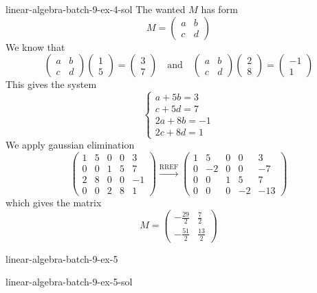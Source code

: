 \documentclass[preview]{standalone}
\begin{document}
\begin{snippetsolution}{linear-algebra-batch-9-ex-4-sol}{}
    The wanted \matrix \(M\) has form
    \[
        M = \begin{pmatrix}
            a & b \\
            c & d
        \end{pmatrix}
    \]
    We know that
    \[
        \begin{pmatrix}
            a & b \\
            c & d
        \end{pmatrix} \begin{pmatrix}
            1 \\
            5
        \end{pmatrix} = \begin{pmatrix}
            3 \\
            7
        \end{pmatrix}
        \quad \text{and} \quad
        \begin{pmatrix}
            a & b \\
            c & d
        \end{pmatrix} \begin{pmatrix}
            2 \\
            8
        \end{pmatrix} = \begin{pmatrix}
            -1 \\
            1
        \end{pmatrix}
    \]
    This gives the system
    \[
        \begin{cases}
            a + 5b = 3 \\
            c + 5d = 7 \\
            2a + 8b = -1 \\
            2c + 8d = 1
        \end{cases}
    \]
    We apply gaussian elimination
    \[
        \begin{pmatrix}
            1 & 5 & 0 & 0 & 3 \\
            0 & 0 & 1 & 5 & 7 \\
            2 & 8 & 0 & 0 & -1 \\
            0 & 0 & 2 & 8 & 1
        \end{pmatrix}
        \xrightarrow{\text{RREF}}
        \begin{pmatrix}
            1 & 5 & 0 & 0 & 3 \\
            0 & -2 & 0 & 0 & -7 \\
            0 & 0 & 1 & 5 & 7 \\
            0 & 0 & 0 & -2 & -13
        \end{pmatrix}
    \]
    which gives the matrix
    \[
        M = \begin{pmatrix}
            -\frac{29}{2} & \frac{7}{2} \\
            -\frac{51}{2} & \frac{13}{2}
        \end{pmatrix}
    \]
\end{snippetsolution}

\begin{snippetexercise}{linear-algebra-batch-9-ex-5}{}
    \todo
\end{snippetexercise}

\begin{snippetsolution}{linear-algebra-batch-9-ex-5-sol}{}
    \todo
\end{snippetsolution}
\end{document}
